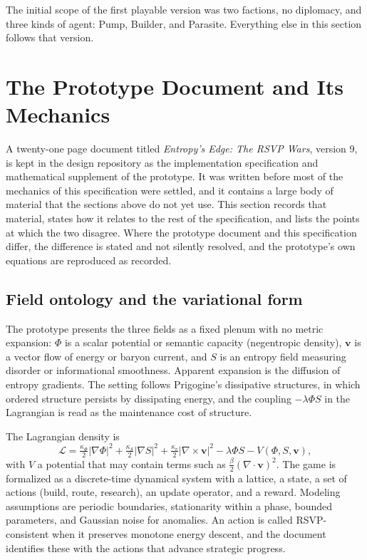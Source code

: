 \documentclass[11pt]{article}
\begin{document}
The initial scope of the first playable version was two factions, no diplomacy, and three kinds of agent: Pump, Builder, and Parasite. Everything else in this section follows that version.

\section{The Prototype Document and Its Mechanics}
\label{sec:prototype}

A twenty-one page document titled \emph{Entropy's Edge: The RSVP Wars}, version 9, is kept in the design repository as the implementation specification and mathematical supplement of the prototype. It was written before most of the mechanics of this specification were settled, and it contains a large body of material that the sections above do not yet use. This section records that material, states how it relates to the rest of the specification, and lists the points at which the two disagree. Where the prototype document and this specification differ, the difference is stated and not silently resolved, and the prototype's own equations are reproduced as recorded.

\subsection{Field ontology and the variational form}

The prototype presents the three fields as a fixed plenum with no metric expansion: $\Phi$ is a scalar potential or semantic capacity (negentropic density), $\mathbf{v}$ is a vector flow of energy or baryon current, and $S$ is an entropy field measuring disorder or informational smoothness. Apparent expansion is the diffusion of entropy gradients. The setting follows Prigogine's dissipative structures, in which ordered structure persists by dissipating energy, and the coupling $-\lambda\Phi S$ in the Lagrangian is read as the maintenance cost of structure.

The Lagrangian density is
\[
\mathcal{L} = \tfrac{\kappa_\Phi}{2}|\nabla\Phi|^2 + \tfrac{\kappa_S}{2}|\nabla S|^2 + \tfrac{\kappa_v}{2}|\nabla\times\mathbf{v}|^2 - \lambda\Phi S - V(\Phi,S,\mathbf{v}),
\]
with $V$ a potential that may contain terms such as $\tfrac{\beta}{2}(\nabla\!\cdot\mathbf{v})^2$. The game is formalized as a discrete-time dynamical system with a lattice, a state, a set of actions (build, route, research), an update operator, and a reward. Modeling assumptions are periodic boundaries, stationarity within a phase, bounded parameters, and Gaussian noise for anomalies. An action is called RSVP-consistent when it preserves monotone energy descent, and the document identifies these with the actions that advance strategic progress.
\end{document}
